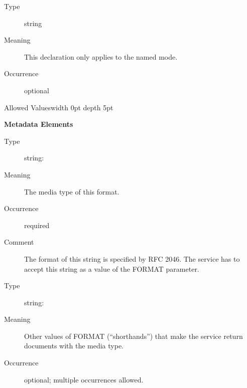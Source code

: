 \documentclass{ivoa}
\begin{document}
\begin{generated}
\begin{bigdescription}
\item[forMode]
\begin{description}
\item[Type] string
\item[Meaning] This declaration only applies to the named mode.
\item[Occurrence] optional

\item[Allowed Values\vrule width 0pt depth 5pt]\hfil
\end{description}

\end{bigdescription}\endgroup



\vspace{0.5ex}\noindent\textbf{ Metadata Elements}

\begingroup\small\begin{bigdescription}\item[Element \xmlel{mime}]
\begin{description}
\item[Type] string: 
\item[Meaning] The media type of this format.
\item[Occurrence] required
\item[Comment] The format of this string is specified by RFC 2046.
          The service has to accept this string as a
          value of the FORMAT parameter.

\end{description}
\item[Element \xmlel{alias}]
\begin{description}
\item[Type] string: 
\item[Meaning] Other values of FORMAT (“shorthands”) that make the service return
          documents with the media type.
\item[Occurrence] optional; multiple occurrences allowed.

\end{description}


\end{bigdescription}\endgroup

\endgroup
\end{generated}
\end{document}
